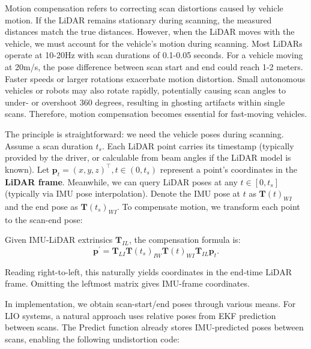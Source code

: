 Motion compensation refers to correcting scan distortions caused by vehicle motion. If the LiDAR remains stationary during scanning, the measured distances match the true distances. However, when the LiDAR moves with the vehicle, we must account for the vehicle's motion during scanning. Most LiDARs operate at 10-20Hz with scan durations of 0.1-0.05 seconds. For a vehicle moving at 20m/s, the pose difference between scan start and end could reach 1-2 meters. Faster speeds or larger rotations exacerbate motion distortion. Small autonomous vehicles or robots may also rotate rapidly, potentially causing scan angles to under- or overshoot 360 degrees, resulting in ghosting artifacts within single scans. Therefore, motion compensation becomes essential for fast-moving vehicles.

The principle is straightforward: we need the vehicle poses during scanning. Assume a scan duration $t_s$. Each LiDAR point carries its timestamp (typically provided by the driver, or calculable from beam angles if the LiDAR model is known). Let $\mathbf{p}_t = (x,y,z)^\top, t \in (0,t_s)$ represent a point's coordinates in the \textbf{LiDAR frame}. Meanwhile, we can query LiDAR poses at any $t \in [0,t_s]$ (typically via IMU pose interpolation). Denote the IMU pose at $t$ as $\mathbf{T}(t)_{WI}$ and the end pose as $\mathbf{T}(t_s)_{WI}$. To compensate motion, we transform each point to the scan-end pose:

Given IMU-LiDAR extrinsics $\mathbf{T}_{IL}$, the compensation formula is:
\begin{equation}\label{key}
	\mathbf{p}^\prime = \mathbf{T}_{LI} \mathbf{T}(t_s)_{IW} \mathbf{T}(t)_{WI} \mathbf{T}_{IL} \mathbf{p}_t.
\end{equation}

Reading right-to-left, this naturally yields coordinates in the end-time LiDAR frame. Omitting the leftmost matrix gives IMU-frame coordinates.

In implementation, we obtain scan-start/end poses through various means. For LIO systems, a natural approach uses relative poses from EKF prediction between scans. The Predict function already stores IMU-predicted poses between scans, enabling the following undistortion code:

